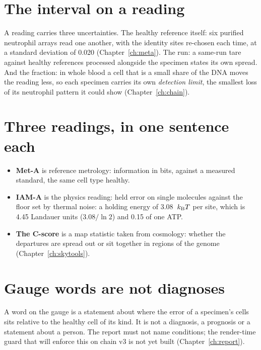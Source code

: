 \section{The interval on a reading}

A reading carries three uncertainties. The healthy reference itself: six purified neutrophil arrays read one another, with
the identity sites re-chosen each time, at a standard deviation of 0.020 (Chapter~\ref{ch:meta}). The run: a same-run tare
against healthy references processed alongside the specimen states its own spread. And the fraction: in whole blood a cell
that is a small share of the DNA moves the reading less, so each specimen carries its own \emph{detection limit}, the
smallest loss of its neutrophil pattern it could show (Chapter~\ref{ch:chain}). \measured

\section{Three readings, in one sentence each}
\begin{itemize}
\item \textbf{Met-A} is reference metrology: information in bits, against a measured standard, the same cell type healthy.
\item \textbf{IAM-A} is the physics reading: held error on single molecules against the floor set by thermal noise: a
holding energy of 3.08~$k_{\mathrm B} T$ per site, which is 4.45 Landauer units ($3.08/\ln2$) and 0.15 of one ATP.
\item \textbf{The C-score} is a map statistic taken from cosmology: whether the departures are spread out or sit together in regions of the
genome (Chapter~\ref{ch:skytools}).
\end{itemize}

\section{Gauge words are not diagnoses}
\begin{rulebox}
A word on the gauge is a statement about where the error of a specimen's cells sits relative to the healthy cell of its kind. It
is not a diagnosis, a prognosis or a statement about a person. The report must not name conditions; the render-time guard that will enforce this on chain v3 is not yet built (Chapter~\ref{ch:report}).
\end{rulebox}
